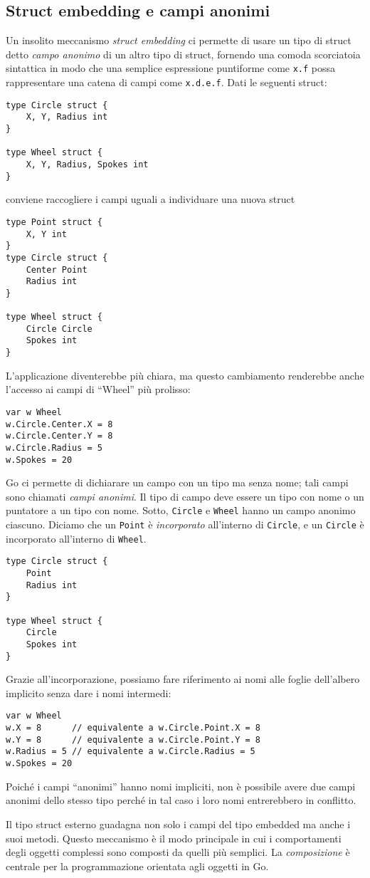 \subsection{Struct embedding e campi anonimi}
\label{subsec:struct_embedding_e_campi_anonimi}%
Un insolito meccanismo \textit{struct embedding} ci permette di usare un tipo di struct detto \textit{campo anonimo} di un altro tipo di struct, fornendo una comoda scorciatoia sintattica in modo che una semplice espressione puntiforme come \verb|x.f| possa rappresentare una catena di campi come \verb|x.d.e.f|.
Dati le seguenti struct:
\begin{lstlisting}[frame=single, label={lst:lstlisting3-4-3.1}]
type Circle struct {
    X, Y, Radius int
}

type Wheel struct {
    X, Y, Radius, Spokes int
}
\end{lstlisting}
conviene raccogliere i campi uguali a individuare una nuova struct
\begin{lstlisting}[frame=single, label={lst:lstlisting3-4-3.2}]
type Point struct {
    X, Y int
}
type Circle struct {
    Center Point
    Radius int
}

type Wheel struct {
    Circle Circle
    Spokes int
}
\end{lstlisting}
L'applicazione diventerebbe più chiara, ma questo cambiamento renderebbe anche l'accesso ai campi di ``Wheel'' più prolisso:
\begin{lstlisting}[frame=single, label={lst:lstlisting3-4-3.3}]
var w Wheel
w.Circle.Center.X = 8
w.Circle.Center.Y = 8
w.Circle.Radius = 5
w.Spokes = 20
\end{lstlisting}
Go ci permette di dichiarare un campo con un tipo ma senza nome;
tali campi sono chiamati \textit{campi anonimi}.
Il tipo di campo deve essere un tipo con nome o un puntatore a un tipo con nome.
Sotto, \verb|Circle| e \verb|Wheel| hanno un campo anonimo ciascuno.
Diciamo che un \verb|Point| è \textit{incorporato} all'interno di \verb|Circle|, e un \verb|Circle| è incorporato all'interno di \verb|Wheel|.
\begin{lstlisting}[frame=single, label={lst:lstlisting3-4-3.4}]
type Circle struct {
    Point
    Radius int
}

type Wheel struct {
    Circle
    Spokes int
}
\end{lstlisting}
Grazie all'incorporazione, possiamo fare riferimento ai nomi alle foglie dell'albero implicito senza dare i nomi intermedi:
\begin{lstlisting}[frame=single,label={lst:lstlisting3-4-3.5}]
var w Wheel
w.X = 8	     // equivalente a w.Circle.Point.X = 8
w.Y = 8	     // equivalente a w.Circle.Point.Y = 8
w.Radius = 5 // equivalente a w.Circle.Radius = 5
w.Spokes = 20
\end{lstlisting}
Poiché i campi ``anonimi'' hanno nomi impliciti, non è possibile avere due campi anonimi dello stesso tipo perché in tal caso i loro nomi entrerebbero in conflitto.

Il tipo struct esterno guadagna non solo i campi del tipo embedded ma anche i suoi metodi.
Questo meccanismo è il modo principale in cui i comportamenti degli oggetti complessi sono composti da quelli più semplici.
La \textit{composizione} è centrale per la programmazione orientata agli oggetti in Go.